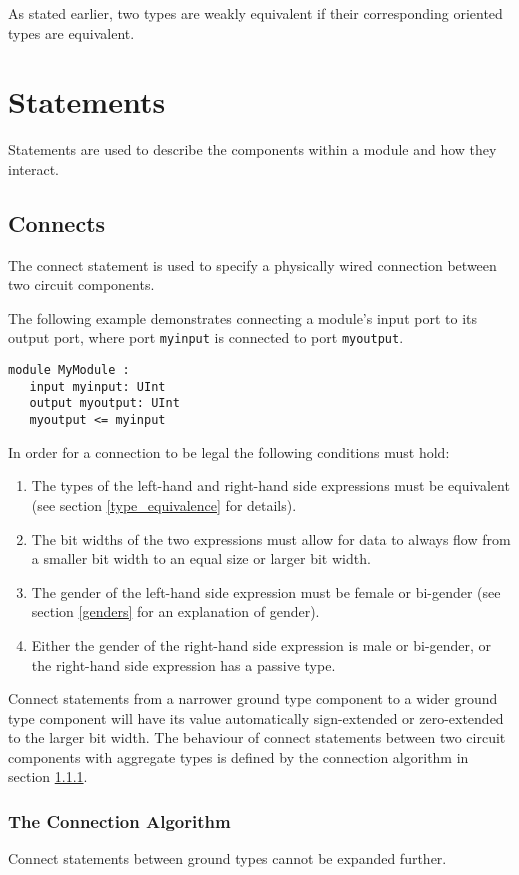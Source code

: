 \documentclass[12pt]{article}
\begin{document}
As stated earlier, two types are weakly equivalent if their corresponding oriented types are equivalent.


\section{Statements} \label{statements}

Statements are used to describe the components within a module and how they interact.

\subsection{Connects}\label{connects}
The connect statement is used to specify a physically wired connection between two circuit components.

The following example demonstrates connecting a module's input port to its output port, where port \verb|myinput| is connected to port \verb|myoutput|.
\begin{verbatim}
module MyModule :
   input myinput: UInt
   output myoutput: UInt
   myoutput <= myinput
\end{verbatim}

In order for a connection to be legal the following conditions must hold:
\begin{enumerate}
\item The types of the left-hand and right-hand side expressions must be equivalent (see section \ref{type_equivalence} for details).
\item The bit widths of the two expressions must allow for data to always flow from a smaller bit width to an equal size or larger bit width.
\item The gender of the left-hand side expression must be female or bi-gender (see section \ref{genders} for an explanation of gender).
\item Either the gender of the right-hand side expression is male or bi-gender, or the right-hand side expression has a passive type.
\end{enumerate}

Connect statements from a narrower ground type component to a wider ground type component will have its value automatically sign-extended or zero-extended to the larger bit width. The behaviour of connect statements between two circuit components with aggregate types is defined by the connection algorithm in section \ref{connection_algorithm}.

\subsubsection{The Connection Algorithm} \label{connection_algorithm}
Connect statements between ground types cannot be expanded further. 
\end{document}
